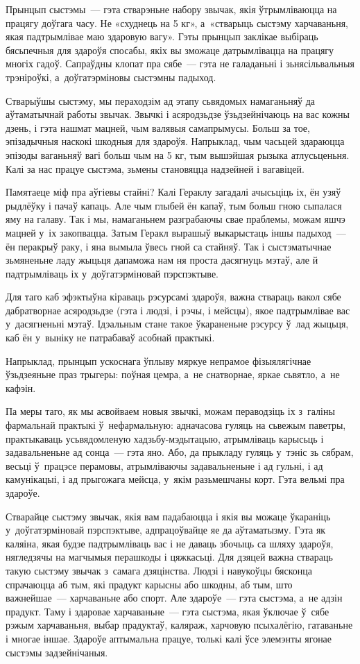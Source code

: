 Прынцып сыстэмы~--- гэта стварэньне набору звычак, якія ўтрымліваюцца на працягу доўгага часу. Не «схуднець на 5 кг», а~«стварыць сыстэму харчаваньня, якая падтрымлівае маю здаровую вагу». Гэты прынцып заклікае выбіраць бясьпечныя для здароўя спосабы, якіх вы зможаце датрымлівацца на працягу многіх гадоў. Сапраўдны клопат пра сябе~--- гэта не галаданьні і зьнясільвальныя трэніроўкі, а~доўгатэрміновы сыстэмны падыход.

Стварыўшы сыстэму, мы пераходзім ад этапу сьвядомых намаганьняў да аўтаматычнай работы звычак. Звычкі і асяродзьдзе ўзьдзейнічаюць на вас кожны дзень, і гэта нашмат мацней, чым валявыя самапрымусы. Больш за тое, эпізадычныя наскокі шкодныя для здароўя. Напрыклад, чым часьцей здараюцца эпізоды ваганьняў вагі больш чым на 5 кг, тым вышэйшая рызыка атлусьценьня. Калі за нас працуе сыстэма, зьмены становяцца надзейней і вагавіцей.

Памятаеце міф пра аўгіевы стайні? Калі Гераклу загадалі ачысьціць іх, ён узяў рыдлёўку і пачаў капаць. Але чым глыбей ён капаў, тым больш гною сыпалася яму на галаву. Так і мы, намаганьнем разграбаючы свае праблемы, можам яшчэ мацней у~іх закопвацца. Затым Геракл вырашыў выкарыстаць іншы падыход~--- ён перакрыў раку, і яна вымыла ўвесь гной са стайняў. Так і сыстэматычнае зьмяненьне ладу жыцьця дапаможа нам ня проста дасягнуць мэтаў, але й падтрымліваць іх у~доўгатэрміновай пэрспэктыве.

Для таго каб эфэктыўна кіраваць рэсурсамі здароўя, важна ствараць вакол сябе дабратворнае асяродзьдзе (гэта і людзі, і рэчы, і мейсцы), якое падтрымлівае вас у~дасягненьні мэтаў. Ідэальным стане такое ўкараненьне рэсурсу ў~лад жыцьця, каб ён у~выніку не патрабаваў асобнай практыкі.

Напрыклад, прынцып ускоснага ўплыву мяркуе непрамое фізыялягічнае ўзьдзеяньне праз трыгеры: поўная цемра, а~не снатворнае, яркае сьвятло, а~не кафэін.

Па меры таго, як мы асвойваем новыя звычкі, можам пераводзіць іх з~галіны фармальнай практыкі ў~нефармальную: адначасова гуляць на сьвежым паветры, практыкаваць усьвядомленую хадзьбу-мэдытацыю, атрымліваць карысьць і задавальненьне ад сонца~--- гэта яно. Або, да прыкладу гуляць у~тэніс зь сябрам, весьці ў~працэсе перамовы, атрымліваючы задавальненьне і ад гульні, і ад камунікацыі, і ад прыгожага мейсца, у~якім разьмешчаны корт. Гэта вельмі пра здароўе.

Стварайце сыстэму звычак, якія вам падабаюцца і якія вы можаце ўкараніць у~доўгатэрміновай пэрспэктыве, адпрацоўвайце яе да аўтаматызму. Гэта як каляіна, якая будзе падтрымліваць вас і не даваць збочыць са шляху здароўя, нягледзячы на магчымыя перашкоды і цяжкасьці. Для дзяцей важна ствараць такую сыстэму звычак з~самага дзяцінства. Людзі і навукоўцы бясконца спрачаюцца аб тым, які прадукт карысны або шкодны, аб тым, што важнейшае~--- харчаваньне або спорт. Але здароўе~--- гэта сыстэма, а~не адзін прадукт. Таму і здаровае харчаваньне~--- гэта сыстэма, якая ўключае ў~сябе рэжым харчаваньня, выбар прадуктаў, каляраж, харчовую псыхалёгію, гатаваньне і многае іншае. Здароўе аптымальна працуе, толькі калі ўсе элемэнты ягонае сыстэмы задзейнічаныя.


